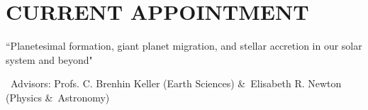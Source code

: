 \section*{CURRENT APPOINTMENT}

``Planetesimal formation, giant planet migration, and stellar accretion in our solar system and beyond"

~Advisors: Profs. C. Brenhin Keller (Earth Sciences) \&\ Elisabeth R. Newton (Physics \&\ Astronomy)